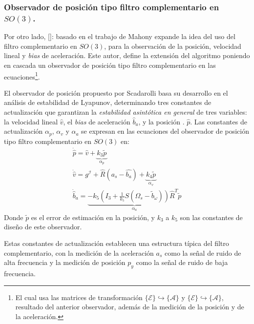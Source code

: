\documentclass[10pt]{report}
\numberwithin{equation}{chapter}
\numberwithin{algorithm}{chapter}
\newcommand{\marco}[1]{\{\mathcal{#1}\}}
\begin{document}
\subsubsection{Observador de posición tipo filtro complementario en $SO(3)$.}
Por otro lado, [\cite{Scandaro2011}]: basado en el trabajo de Mahony expande la idea del uso del filtro complementario en $SO(3)$, para la observación de la posición, velocidad lineal y \emph{bias} de aceleración. Este autor, define la extensión del algoritmo poniendo en cascada un observador de posición tipo filtro complementario en las ecuaciones\footnote{El cual usa las matrices de transformación $\marco{E}\hookrightarrow\marco{A}$ y $\marco{E}\hookrightarrow\marco{A}$, resultado del anterior observador, además de la medición de la posición y de la aceleración.}.\par
El observador de posición propuesto por Scadarolli basa su desarrollo en el análisis de estabilidad de Lyapunov, determinando tres constantes de actualización que garantizan la \emph{estabilidad asintótica en general} de tres variables: la velocidad lineal $\hat{v}$, el \emph{bias} de aceleración $\hat{b}_a$, y la posición . $\hat{p}$. Las constantes de actualización $\alpha_p$, $\alpha_v$ y $\alpha_a$ se expresan en las ecuaciones del observador de posición tipo filtro complementario en $SO(3)$ en:
\begin{equation}\label{problema_ecc5}
\begin{array}{c}
\dot{\hat{p}}=\hat{v}+\underbrace{k_3\tilde{p}}_{\alpha_p}\\
\dot{\hat{v}}=g^\mathcal{I}+\hat{R}(a_s-\hat{b_a})+\underbrace{k_4\tilde{p}}_{\alpha_v}\\
\dot{\hat{b}}_a=\underbrace{-k_5(I_3+\frac{1}{k_5}S(\Omega_s-\tilde{b}_\omega))\hat{R}^T\tilde{p}}_{\alpha_a}
\end{array}
\end{equation}
Donde $\tilde{p}$ es el error de estimación en la posición, y $k_3$ a $k_5$ son las constantes de diseño de este observador.\par
Estas constantes de actualización establecen una estructura típica del filtro complementario, con la medición de la aceleración $a_s$ como la señal de ruido de alta frecuencia y la medición de posición $p_y$ como la señal de ruido de baja frecuencia. 
\end{document}

